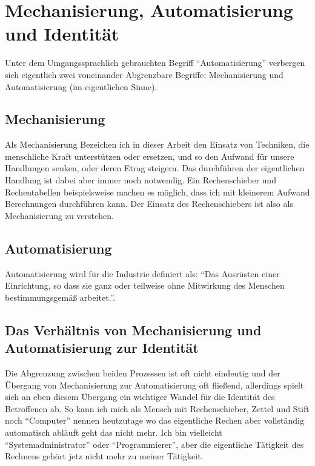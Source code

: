 \section {Mechanisierung, Automatisierung und Identität}

Unter dem Umgangssprachlich gebrauchten Begriff \enquote{Automatisierung} verbergen sich eigentlich zwei voneinander Abgrenzbare Begriffe: Mechanisierung und Automatisierung (im eigentlichen Sinne).

\subsection {Mechanisierung}

Als Mechanisierung Bezeichen ich in dieser Arbeit den Einsatz von Techniken, die menschliche Kraft unterstützen oder ersetzen, und so den Aufwand für unsere Handlungen senken, oder deren Etrag steigern. Das durchführen der eigentlichen Handlung ist dabei aber immer noch notwendig. Ein Rechenschieber und Rechentabellen beispielsweise machen es möglich, dass ich mit kleinerem Aufwand Berechnungen durchführen kann.
Der Einsatz des Rechenschiebers ist also als Mechanisierung zu verstehen.

\subsection {Automatisierung}

Automatisierung wird für die Industrie definiert als: \enquote{Das Ausrüsten einer Einrichtung, so dass sie ganz oder teilweise ohne Mitwirkung des Menschen bestimmungsgemäß arbeitet.}\parencite{din19233}.

\subsection {Das Verhältnis von Mechanisierung und Automatisierung zur Identität}

Die Abgrenzung zwischen beiden Prozessen ist oft nicht eindeutig und der Übergang von Mechanisierung zur Automatisierung oft fließend, allerdings spielt sich an eben diesem Übergang ein wichtiger Wandel für die Identität des Betroffenen ab. So kann ich mich als Mensch mit Rechenschieber, Zettel und Stift noch \enquote{Computer} nennen heutzutage wo das eigentliche Rechen aber vollständig automatisch abläuft geht das nicht mehr. Ich bin vielleicht \enquote{Systemadministrator} oder \enquote{Programmierer}, aber die eigentliche Tätigkeit des Rechnens gehört jetz nicht mehr zu meiner Tätigkeit.

